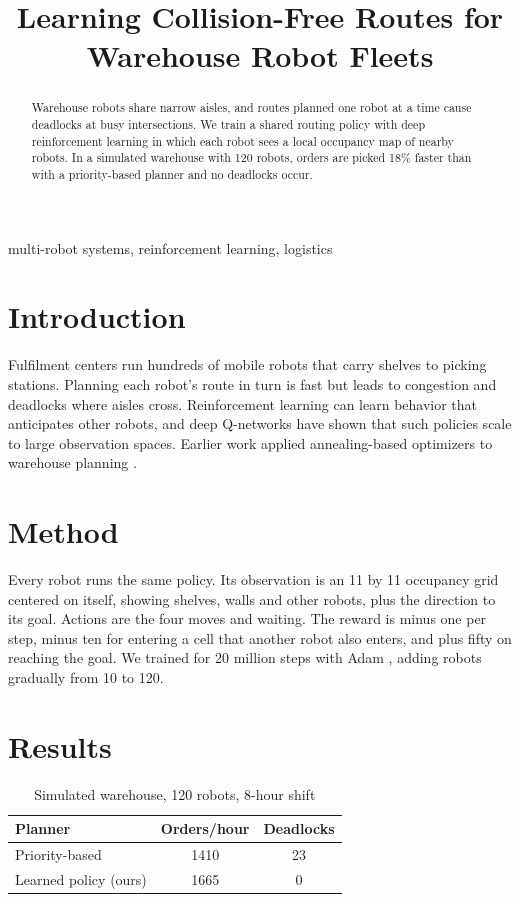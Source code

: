 \documentclass[conference]{IEEEtran}
\begin{document}
\title{Learning Collision-Free Routes for Warehouse Robot Fleets}
\author{}
\maketitle
\begin{abstract}
Warehouse robots share narrow aisles, and routes planned one robot at a time cause deadlocks at busy intersections. We train a shared routing policy with deep reinforcement learning in which each robot sees a local occupancy map of nearby robots. In a simulated warehouse with 120 robots, orders are picked 18\% faster than with a priority-based planner and no deadlocks occur.
\end{abstract}
\begin{IEEEkeywords}
multi-robot systems, reinforcement learning, logistics
\end{IEEEkeywords}
\section{Introduction}
Fulfilment centers run hundreds of mobile robots that carry shelves to picking stations. Planning each robot's route in
turn is fast but leads to congestion and deadlocks where aisles cross. Reinforcement learning \cite{sutton} can learn
behavior that anticipates other robots, and deep Q-networks \cite{mnih} have shown that such policies scale to large
observation spaces. Earlier work applied annealing-based optimizers to warehouse planning \cite{fake}.

\section{Method}
Every robot runs the same policy. Its observation is an 11 by 11 occupancy grid centered on itself, showing shelves,
walls and other robots, plus the direction to its goal. Actions are the four moves and waiting. The reward is minus one
per step, minus ten for entering a cell that another robot also enters, and plus fifty on reaching the goal. We trained
for 20 million steps with Adam \cite{kingma}, adding robots gradually from 10 to 120.

\section{Results}
\begin{table}[t]
\caption{Simulated warehouse, 120 robots, 8-hour shift\label{t6}}
\centering
\begin{tabular}{lcc}
\hline
Planner & Orders/hour & Deadlocks \\
\hline
Priority-based & 1410 & 23 \\
Learned policy (ours) & 1665 & 0 \\
\hline
\end{tabular}
\end{table}
\end{document}
